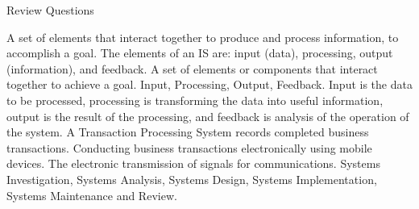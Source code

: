 \documentclass[\main/notes.tex]{subfiles}
\begin{document}
				\begin{exercise}{Review Questions}
					\begin{enumerate}
						 A set of elements that interact together to produce and process information, to accomplish a goal. The elements of an IS are: input (data), processing, output (information), and feedback.
						 A set of elements or components that interact together to achieve a goal.
						 Input, Processing, Output, Feedback. Input is the data to be processed, processing is transforming the data into useful information, output is the result of the processing, and feedback is analysis of the operation of the system.
						 A Transaction Processing System records completed business transactions.
						 Conducting business transactions electronically using mobile devices.
						 The electronic transmission of signals for communications.
						 Systems Investigation, Systems Analysis, Systems Design, Systems Implementation, Systems Maintenance and Review.
					\end{enumerate}
				\end{exercise}
		\vbox{}
\end{document}
